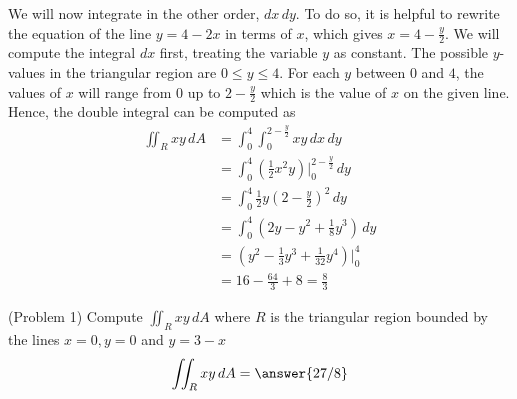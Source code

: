 \documentclass[handout]{ximera}
\begin{document}
\begin{example}[Example 1]
We will now integrate in the other order, $dx \, dy$. To do so, it is helpful to rewrite the equation of the line $y = 4 - 2x$ in terms of $x$, which gives
$x = 4 - \frac{y}{2}$. 
We will compute the integral $dx$ first, treating the variable $y$ as constant. 
The possible $y$-values in the triangular region are $0 \leq y \leq 4$.  
For each $y$ between $0$ and $4$, the values of $x$ will range from $0$ up to $2 - \frac{y}{2}$ which is the value of $x$ on the given line.
Hence, the double integral can be computed as
\begin{align*}
\iint_R xy \, dA & = \int_0^4 \int_0^{2 - \frac{y}{2}} xy \, dx \, dy\\
                 & = \int_0^4 \left(\frac12 x^2y \right) \bigg|_{0}^{2 - \frac{y}{2}} \, dy\\
                 & = \int_0^4 \frac12 y \left(2 - \frac{y}{2}\right)^2 \, dy\\
                 &= \int_0^4 \left(2y - y^2 + \frac18 y^3\right) \, dy\\
                 &= \left(y^2 - \frac13 y^3 + \frac{1}{32} y^4 \right) \bigg|_0^4\\
                 &= 16 - \frac{64}{3} + 8 = \frac83
\end{align*}      

\begin{image}
\end{image}

\end{example}


\begin{problem}(Problem 1)
Compute $\iint_R xy \, dA$ where $R$ is the triangular region bounded by the lines $x = 0, y = 0$ and $y = 3-x$\\
\[
\iint_R xy \, dA = \answer{27/8}
\]
\end{problem}
\end{document}
